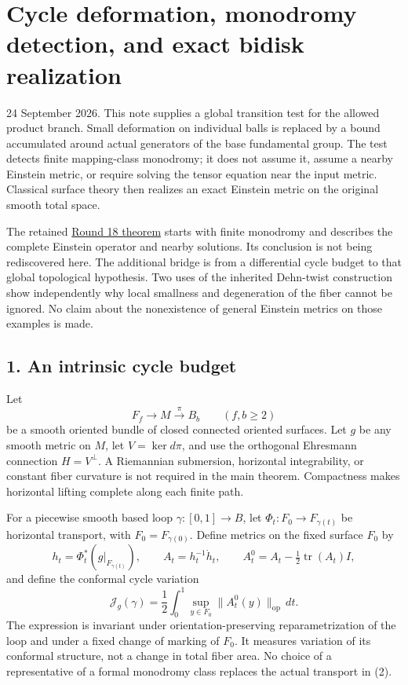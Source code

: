 \documentclass[
  11pt,
]{article}
\author{}
\date{}
\begin{document}
\hypertarget{cycle-deformation-monodromy-detection-and-exact-bidisk-realization}{%
\section{Cycle deformation, monodromy detection, and exact bidisk
realization}\label{cycle-deformation-monodromy-detection-and-exact-bidisk-realization}}

24 September 2026. This note supplies a global transition test for the
allowed product branch. Small deformation on individual balls is
replaced by a bound accumulated around actual generators of the base
fundamental group. The test detects finite mapping-class monodromy; it
does not assume it, assume a nearby Einstein metric, or require solving
the tensor equation near the input metric. Classical surface theory then
realizes an exact Einstein metric on the original smooth total space.

The retained
\href{../mathematics/current/round18_twisted_operator.md}{Round 18
theorem} starts with finite monodromy and describes the complete
Einstein operator and nearby solutions. Its conclusion is not being
rediscovered here. The additional bridge is from a differential cycle
budget to that global topological hypothesis. Two uses of the inherited
Dehn-twist construction show independently why local smallness and
degeneration of the fiber cannot be ignored. No claim about the
nonexistence of general Einstein metrics on those examples is made.

\hypertarget{an-intrinsic-cycle-budget}{%
\subsection{1. An intrinsic cycle
budget}\label{an-intrinsic-cycle-budget}}

Let \[
                 F_f\longrightarrow M\xrightarrow{\pi}B_b
                 \qquad(f,b\ge2)
\tag{1}
\] be a smooth oriented bundle of closed connected oriented surfaces.
Let \(g\) be any smooth metric on \(M\), let \(V=\ker d\pi\), and use
the orthogonal Ehresmann connection \(H=V^\perp\). A Riemannian
submersion, horizontal integrability, or constant fiber curvature is not
required in the main theorem. Compactness makes horizontal lifting
complete along each finite path.

For a piecewise smooth based loop \(\gamma:[0,1]\to B\), let
\(\Phi_t:F_0\to F_{\gamma(t)}\) be horizontal transport, with
\(F_0=F_{\gamma(0)}\). Define metrics on the fixed surface \(F_0\) by \[
 h_t=\Phi_t^*(g|_{F_{\gamma(t)}}),\qquad
 A_t=h_t^{-1}\dot h_t,\qquad
 A_t^0=A_t-\tfrac12\operatorname{tr}(A_t)I,
\] and define the conformal cycle variation \[
 \mathcal J_g(\gamma)
       =\frac12\int_0^1\sup_{y\in F_0}
                          \|A_t^0(y)\|_{\mathrm{op}}\,dt.
\tag{2}
\] The expression is invariant under orientation-preserving
reparametrization of the loop and under a fixed change of marking of
\(F_0\). It measures variation of its conformal structure, not a change
in total fiber area. No choice of a representative of a formal monodromy
class replaces the actual transport in (2).
\end{document}
